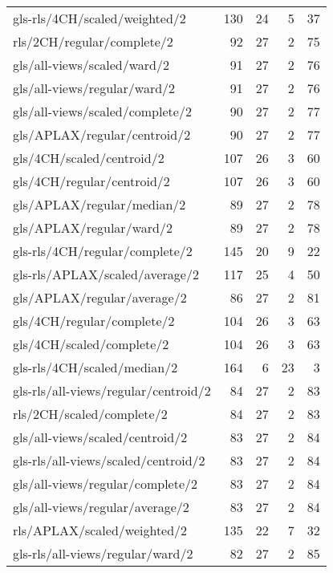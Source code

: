 \begin{longtable}{lrrrr}
    gls-rls/4CH/scaled/weighted/2             & 130 & 24 &  5 & 37 \\
    rls/2CH/regular/complete/2                &  92 & 27 &  2 & 75 \\
    gls/all-views/scaled/ward/2               &  91 & 27 &  2 & 76 \\
    gls/all-views/regular/ward/2              &  91 & 27 &  2 & 76 \\
    gls/all-views/scaled/complete/2           &  90 & 27 &  2 & 77 \\
    gls/APLAX/regular/centroid/2              &  90 & 27 &  2 & 77 \\
    gls/4CH/scaled/centroid/2                 & 107 & 26 &  3 & 60 \\
    gls/4CH/regular/centroid/2                & 107 & 26 &  3 & 60 \\
    gls/APLAX/regular/median/2                &  89 & 27 &  2 & 78 \\
    gls/APLAX/regular/ward/2                  &  89 & 27 &  2 & 78 \\
    gls-rls/4CH/regular/complete/2            & 145 & 20 &  9 & 22 \\
    gls-rls/APLAX/scaled/average/2            & 117 & 25 &  4 & 50 \\
    gls/APLAX/regular/average/2               &  86 & 27 &  2 & 81 \\
    gls/4CH/regular/complete/2                & 104 & 26 &  3 & 63 \\
    gls/4CH/scaled/complete/2                 & 104 & 26 &  3 & 63 \\
    gls-rls/4CH/scaled/median/2               & 164 &  6 & 23 &  3 \\
    gls-rls/all-views/regular/centroid/2      &  84 & 27 &  2 & 83 \\
    rls/2CH/scaled/complete/2                 &  84 & 27 &  2 & 83 \\
    gls/all-views/scaled/centroid/2           &  83 & 27 &  2 & 84 \\
    gls-rls/all-views/scaled/centroid/2       &  83 & 27 &  2 & 84 \\
    gls/all-views/regular/complete/2          &  83 & 27 &  2 & 84 \\
    gls/all-views/regular/average/2           &  83 & 27 &  2 & 84 \\
    rls/APLAX/scaled/weighted/2               & 135 & 22 &  7 & 32 \\
    gls-rls/all-views/regular/ward/2          &  82 & 27 &  2 & 85 \\

\end{longtable}
